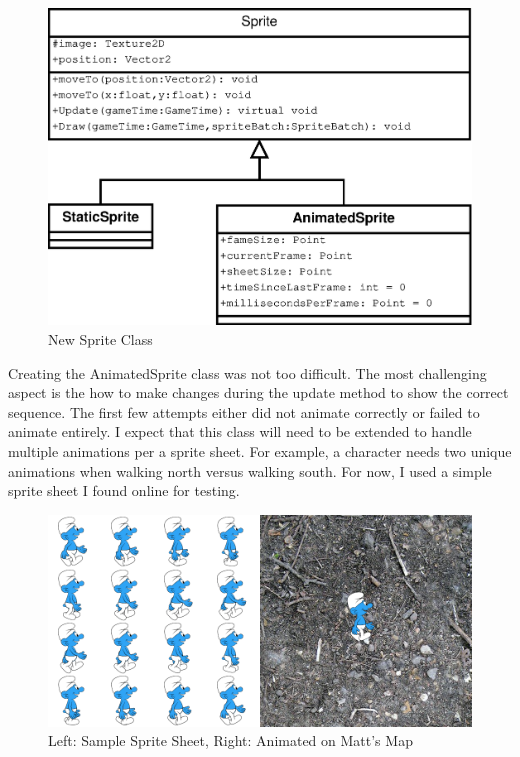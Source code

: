 \documentclass[]{article}
\begin{document}
			\begin{figure}[H]
				\centering
				\includegraphics[scale=0.50]{UML/Sprite}
				\caption{New Sprite Class}				
			\end{figure}
			
			Creating the AnimatedSprite class was not too difficult.  The most challenging aspect is the how to make changes during the update method to show the correct sequence.  The first few attempts either did not animate correctly or failed to animate entirely.  I expect that this class will need to be extended to handle multiple animations per a sprite sheet.  For example,  a character needs two unique animations when walking north versus walking south.  For now, I used a simple sprite sheet I found online for testing.
			
			\begin{figure}[H]
				\centering
				\includegraphics[scale=0.40]{UML/SpriteSampleScreen}
				\caption{Left: Sample Sprite Sheet, Right: Animated on Matt's Map}
			\end{figure}
			
\end{document}
